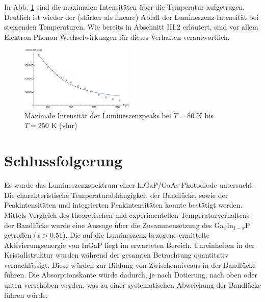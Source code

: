 \documentclass[aps,twocolumn,secnumarabic,nobalancelastpage,amsmath,amssymb,
nofootinbib,superscriptaddress]{revtex4-1}
\begin{document}
In Abb. \ref{fig:maxInt} sind die maximalen Intensitäten über die Temperatur aufgetragen. Deutlich ist wieder
der (stärker als lineare) Abfall der Lumineszenz-Intensität bei steigenden Temperaturen. Wie bereits in Abschnitt III.2 erläutert,
sind vor allem Elektron-Phonon-Wechselwirkungen für dieses Verhalten verantwortlich.

\begin{figure}[t]
  \centering
  \includegraphics[width=0.48\textwidth]{../Messung/maxintenstempfit.eps}
  \caption{\label{fig:maxInt}Maximale Intensität der Lumineszenzpeaks bei $T=80\text{ K}$ bis $T=250\text{ K}$ (vlnr)}
\end{figure}

\section{Schlussfolgerung}

\noindent Es wurde das Lumineszenzspektrum einer InGaP/GaAs-Photodiode untersucht. Die charakteristische Temperaturabhängigkeit der
Bandlücke, sowie der Peakintensitäten und integrierten Peakintensitäten konnte bestätigt werden. Mittels Vergleich des theoretischen
und experimentellen Temperaturverhaltens der Bandlücke wurde eine Aussage über die Zusammensetzung des Ga$_x$In$_{1-x}$P getroffen
($x>0.51$). Die auf die Lumineszenz bezogene ermittelte Aktivierungsenergie von InGaP liegt im erwarteten Bereich.
Unreinheiten in der Kristallstruktur wurden während der gesamten Betrachtung quantitativ vernachlässigt. Diese würden zur Bildung
von Zwischenniveaus in der Bandlücke führen. Die Absorptionskante würde dadurch, je nach Dotierung, nach oben oder unten verschoben werden, was
zu einer systematischen Abweichung der Bandlücke führen würde.
\end{document}
